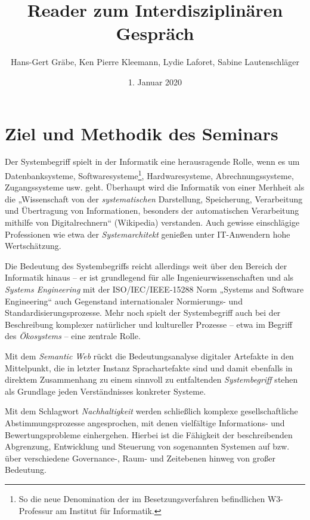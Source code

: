\documentclass[11pt,a4paper]{article}
\title{Reader zum Interdisziplinären Gespräch}
\author{Hans-Gert Gr\"abe, Ken Pierre Kleemann, Lydie Laforet, Sabine
  Lautenschläger}
\date{1. Januar 2020}
\begin{document}
\maketitle
\tableofcontents

\section{Ziel und Methodik des Seminars}

Der Systembegriff spielt in der Informatik eine herausragende Rolle, wenn es
um Datenbanksysteme, Softwaresysteme\footnote{So die neue Denomination der im
  Besetzungsverfahren befindlichen W3-Professur am Institut für Informatik.},
Hardwaresysteme, Abrechnungssysteme, Zugangssysteme usw. geht.  Überhaupt wird
die Informatik von einer Merhheit als die „Wissenschaft von der
\emph{systematischen} Darstellung, Speicherung, Verarbeitung und Übertragung
von Informationen, besonders der automatischen Verarbeitung mithilfe von
Digitalrechnern“ (Wikipedia) verstanden.  Auch gewisse einschlägige
Professionen wie etwa der \emph{Systemarchitekt} genießen unter IT-Anwendern
hohe Wertschätzung.

Die Bedeutung des Systembegriffs reicht allerdings weit über den Bereich der
Informatik hinaus -- er ist grundlegend für alle Ingenieurwissenschaften und
als \emph{Systems Engineering} mit der ISO/IEC/IEEE-15288 Norm „Systems and
Software Engineering“ auch Gegenstand internationaler Normierungs- und
Standardisierungsprozesse.  Mehr noch spielt der Systembegriff auch bei der
Beschreibung komplexer natürlicher und kultureller Prozesse -- etwa im Begriff
des \emph{Ökosystems} -- eine zentrale Rolle.

Mit dem \emph{Semantic Web} rückt die Bedeutungsanalyse digitaler Artefakte in
den Mittelpunkt, die in letzter Instanz Sprachartefakte sind und damit
ebenfalls in direktem Zusammenhang zu einem sinnvoll zu entfaltenden
\emph{Systembegriff} stehen als Grundlage jeden Verständnisses konkreter
Systeme.

Mit dem Schlagwort \emph{Nachhaltigkeit} werden schließlich komplexe
gesellschaftliche Abstimmungsprozesse angesprochen, mit denen vielfältige
Informations- und Bewertungsprobleme einhergehen. Hierbei ist die Fähigkeit
der beschreibenden Abgrenzung, Entwicklung und Steuerung von sogenannten
Systemen auf bzw. über verschiedene Governance-, Raum- und Zeitebenen hinweg
von großer Bedeutung.
\end{document}
